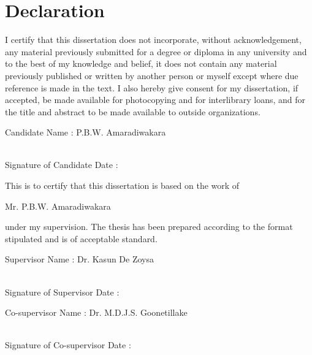 \chapter*{Declaration}

I certify that this dissertation does not incorporate, without acknowledgement, any material previously submitted for a degree or diploma in any university and to the best of my knowledge and belief, it does not contain any material previously published or written by another person or myself except where due reference is made in the text. I also hereby give consent for my dissertation, if accepted, be made available for photocopying and for interlibrary loans, and for the title and abstract to be made available to outside organizations.

\vspace{0.5cm}
\noindent
Candidate Name : P.B.W. Amaradiwakara

\vspace{1.25cm}
\noindent
\makebox[130pt]{\dotfill} \\
Signature of Candidate \hspace{144pt} Date :


\vspace{1cm}
\noindent
This is to certify that this dissertation is based on the work of

\vspace{6pt}
\noindent
Mr. P.B.W. Amaradiwakara

\vspace{6pt}
\noindent
under my supervision. The thesis has been prepared according to the format stipulated and is of acceptable standard.

\vspace{0.5cm}
\noindent
Supervisor Name : Dr. Kasun De Zoysa

\vspace{1cm}
\noindent
\makebox[130pt]{\dotfill} \\
Signature of Supervisor \hspace{144pt} Date :

\vspace{1cm}
\noindent
Co-supervisor Name : Dr. M.D.J.S. Goonetillake

\vspace{1cm}
\noindent
\makebox[130pt]{\dotfill} \\
Signature of Co-supervisor \hspace{128pt} Date :
